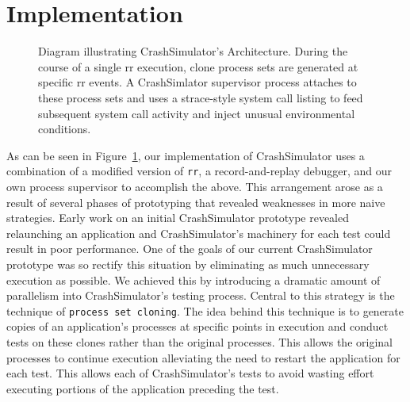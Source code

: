 \section{Implementation}
\label{SEC:Implementation}

\begin{figure}[t]
  \center{}
  \caption{Diagram illustrating CrashSimulator's Architecture.  During the
    course of a single rr execution, clone process sets are generated at
    specific rr events.  A CrashSimlator supervisor process attaches to
    these process sets and uses a strace-style system call listing to feed
    subsequent system call activity and inject unusual environmental
    conditions.}
  \label{figure:architecture}
\end{figure}

As can be seen in Figure~\ref{figure:architecture},
our implementation of CrashSimulator uses a combination of a modified
version of {\tt rr}, a
record-and-replay debugger, and our own process supervisor
to accomplish the above.  This arrangement arose as a result of several
phases of prototyping that revealed weaknesses in more naive strategies.
Early work on an initial CrashSimulator prototype revealed relaunching an
application and CrashSimulator's machinery for each test could result in
poor performance.  One of the goals of our current CrashSimulator prototype
was so rectify this situation by eliminating as much unnecessary execution
as possible.  We achieved this by introducing a dramatic amount of
parallelism into CrashSimulator's testing process.
Central to this strategy is the technique of
{\tt process set cloning}.  The idea behind this technique
is to generate copies
of an application's processes at specific points in execution and conduct
tests on these clones rather than the original processes.  This allows the
original processes to continue execution alleviating the need to restart
the application for each test.  This allows each of CrashSimulator's tests
to avoid wasting effort executing portions of the application preceding
the test.

